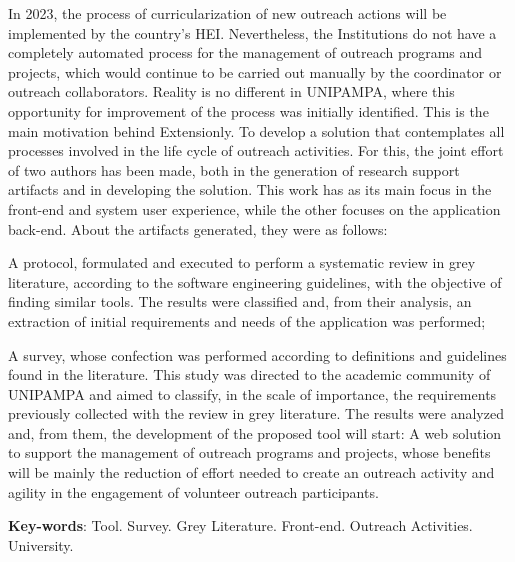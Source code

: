 \begin{resumo}[Abstract]
  In 2023, the process of curricularization of new outreach actions will be implemented by the country's \ac{HEI}. Nevertheless, the Institutions do not have a completely automated process for the management of outreach programs and projects, which would continue to be carried out manually by the coordinator or outreach collaborators. Reality is no different in \acs{UNIPAMPA}, where this opportunity for improvement of the process was initially identified. This is the main motivation behind Extensionly. To develop a solution that contemplates all processes involved in the life cycle of outreach activities. For this, the joint effort of two authors has been made, both in the generation of research support artifacts and in developing the solution. This work has as its main focus in the front-end and system user experience, while the other focuses on the application back-end. About the artifacts generated, they were as follows:
  \begin{inparaenum}[(a)]
    \item A protocol, formulated and executed to perform a systematic review in grey literature, according to the software engineering guidelines, with the objective of finding similar tools. The results were classified and, from their analysis, an extraction of initial requirements and needs of the application was performed;
    \item A survey, whose confection was performed according to definitions and guidelines found in the literature. This study was directed to the academic community of \acs{UNIPAMPA} and aimed to classify, in the scale of importance, the requirements previously collected with the review in grey literature. The results were analyzed and, from them, the development of the proposed tool will start: A web solution to support the management of outreach programs and projects, whose benefits will be mainly the reduction of effort needed to create an outreach activity and agility in the engagement of volunteer outreach participants.
  \end{inparaenum}

  \vspace{\onelineskip}

  \noindent
  \textbf{Key-words}: Tool. Survey. Grey Literature. Front-end. Outreach Activities. University.
\end{resumo}
